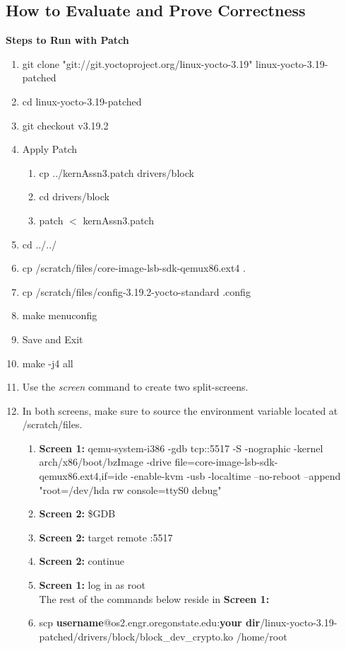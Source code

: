 \documentclass[draftclsnofoot, onecolumn, 10pt, compsoc]{IEEEtran}
\begin{document}
		\subsection{How to Evaluate and Prove Correctness}
			\textbf{Steps to Run with Patch}
			\begin{enumerate}
				\item git clone "git://git.yoctoproject.org/linux-yocto-3.19" linux-yocto-3.19-patched
				\item cd linux-yocto-3.19-patched
				\item git checkout v3.19.2
				\item Apply Patch
				\begin{enumerate}
					\item cp ../kernAssn3.patch drivers/block
					\item cd drivers/block
					\item patch $<$ kernAssn3.patch
				\end{enumerate}
				\item cd ../../
				\item cp /scratch/files/core-image-lsb-sdk-qemux86.ext4 .
				\item cp /scratch/files/config-3.19.2-yocto-standard .config
				\item make menuconfig
				\item Save and Exit
				\item make -j4 all
				\item Use the \textit{screen} command to create two split-screens.
				\item In both screens, make sure to source the environment variable located at /scratch/files.
				\begin{enumerate}
					\item \textbf{Screen 1:}
						qemu-system-i386 -gdb tcp::5517 -S -nographic -kernel arch/x86/boot/bzImage -drive file=core-image-lsb-sdk-qemux86.ext4,if=ide -enable-kvm -usb -localtime --no-reboot --append "root=/dev/hda rw console=ttyS0 debug"
					\item \textbf{Screen 2:} \$GDB
					\item \textbf{Screen 2:} target remote :5517
					\item \textbf{Screen 2:} continue
					\item \textbf{Screen 1:} log in as root \\
						The rest of the commands below reside in \textbf{Screen 1:}
					\item scp \textbf{username}@os2.engr.oregonstate.edu:\textbf{your dir}/linux-yocto-3.19-patched/drivers/block/block\_dev\_crypto.ko /home/root

\end{enumerate}
\end{enumerate}
\end{document}

